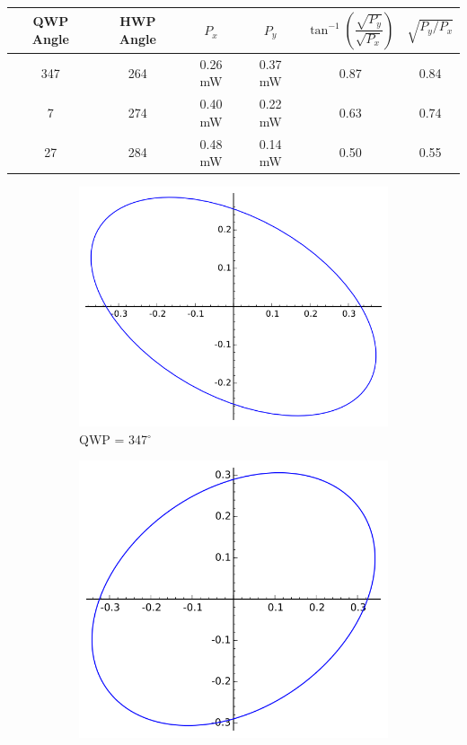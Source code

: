 \documentclass[10pt,a4paper]{article}
\begin{document}
\begin{table}[h]
\centering
\begin{tabular}{|c|c|c|c|c|c|}
\hline 
QWP Angle & HWP Angle & $P_{x}$ & $P_{y}$ & $\tan^{-1}\left(\dfrac{\sqrt{P_{y}}}{\sqrt{P_{x}}}\right)$ & $\sqrt{P_{y}/P_{x}}$ \\ 
\hline 
347 & 264 & 0.26 mW & 0.37 mW & 0.87 & 0.84 \\
7 & 274 & 0.40 mW & 0.22 mW & 0.63 & 0.74 \\  
27 & 284 & 0.48 mW & 0.14 mW & 0.50 & 0.55 \\ 
\hline 
\end{tabular} 
\end{table}

\begin{figure}
\begin{subfigure}[b]{0.3\textwidth}
\centering
\includegraphics[width=\textwidth]{../Analysis/QWP347.png} 
\caption{QWP = 347$^{\circ}$}
\end{subfigure}
\begin{subfigure}[b]{0.3\textwidth}
\centering
\includegraphics[width=\textwidth]{../Analysis/QWP7.png}

\end{subfigure}
\end{figure}
\end{document}
